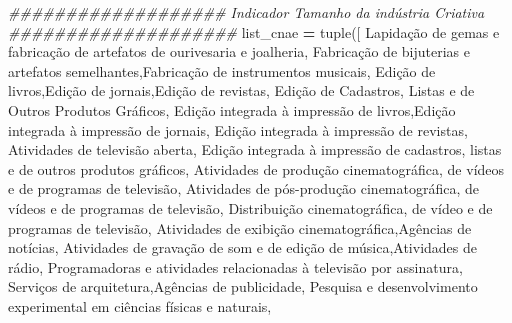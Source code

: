 \documentclass[
  12,
  dvipsnames]{article}
\newenvironment{Shaded}{\begin{snugshade}}{\end{snugshade}}
\newcommand{\BuiltInTok}[1]{#1}
\newcommand{\CommentTok}[1]{\textcolor[rgb]{0.56,0.35,0.01}{\textit{#1}}}
\newcommand{\NormalTok}[1]{#1}
\newcommand{\OperatorTok}[1]{\textcolor[rgb]{0.81,0.36,0.00}{\textbf{#1}}}
\newcommand{\StringTok}[1]{\textcolor[rgb]{0.31,0.60,0.02}{#1}}
\begin{document}
\begin{Shaded}
\begin{Highlighting}[]
\CommentTok{\#\#\#\#\#\#\#\#\#\#\#\#\#\#\#\#\#\#\# Indicador Tamanho da indústria Criativa \#\#\#\#\#\#\#\#\#\#\#\#\#\#\#\#\#\#\#\#}
\NormalTok{list\_cnae }\OperatorTok{=} \BuiltInTok{tuple}\NormalTok{([}
    \StringTok{\textquotesingle{}Lapidação de gemas e fabricação de artefatos de ourivesaria e joalheria\textquotesingle{}}\NormalTok{,}
    \StringTok{\textquotesingle{}Fabricação de bijuterias e artefatos semelhantes\textquotesingle{}}\NormalTok{,}\StringTok{\textquotesingle{}Fabricação de instrumentos musicais\textquotesingle{}}\NormalTok{,}
    \StringTok{\textquotesingle{}Edição de livros\textquotesingle{}}\NormalTok{,}\StringTok{\textquotesingle{}Edição de jornais\textquotesingle{}}\NormalTok{,}\StringTok{\textquotesingle{}Edição de revistas\textquotesingle{}}\NormalTok{,}
    \StringTok{\textquotesingle{}Edição de Cadastros, Listas e de Outros Produtos Gráficos\textquotesingle{}}\NormalTok{,}
    \StringTok{\textquotesingle{}Edição integrada à impressão de livros\textquotesingle{}}\NormalTok{,}\StringTok{\textquotesingle{}Edição integrada à impressão de jornais\textquotesingle{}}\NormalTok{,}
    \StringTok{\textquotesingle{}Edição integrada à impressão de revistas\textquotesingle{}}\NormalTok{, }\StringTok{\textquotesingle{}Atividades de televisão aberta\textquotesingle{}}\NormalTok{,}
    \StringTok{\textquotesingle{}Edição integrada à impressão de cadastros, listas e de outros produtos gráficos\textquotesingle{}}\NormalTok{,}
    \StringTok{\textquotesingle{}Atividades de produção cinematográfica, de vídeos e de programas de televisão\textquotesingle{}}\NormalTok{,}
    \StringTok{\textquotesingle{}Atividades de pós{-}produção cinematográfica, de vídeos e de programas de televisão\textquotesingle{}}\NormalTok{,}
    \StringTok{\textquotesingle{}Distribuição cinematográfica, de vídeo e de programas de televisão\textquotesingle{}}\NormalTok{,}
    \StringTok{\textquotesingle{}Atividades de exibição cinematográfica\textquotesingle{}}\NormalTok{,}\StringTok{\textquotesingle{}Agências de notícias\textquotesingle{}}\NormalTok{,}
    \StringTok{\textquotesingle{}Atividades de gravação de som e de edição de música\textquotesingle{}}\NormalTok{,}\StringTok{\textquotesingle{}Atividades de rádio\textquotesingle{}}\NormalTok{,}
    \StringTok{\textquotesingle{}Programadoras e atividades relacionadas à televisão por assinatura\textquotesingle{}}\NormalTok{,}
    \StringTok{\textquotesingle{}Serviços de arquitetura\textquotesingle{}}\NormalTok{,}\StringTok{\textquotesingle{}Agências de publicidade\textquotesingle{}}\NormalTok{,}
    \StringTok{\textquotesingle{}Pesquisa e desenvolvimento experimental em ciências físicas e naturais\textquotesingle{}}\NormalTok{,}

\end{Highlighting}
\end{Shaded}
\end{document}
